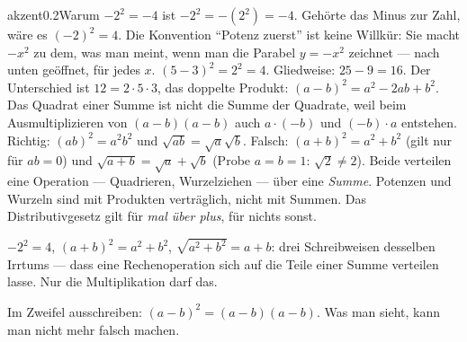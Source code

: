 \begin{loesungkarte}{akzent}{0.2}{Warum $-2^{2} = -4$ ist}
$-2^{2} = -(2^{2}) = -4$. Gehörte das Minus zur Zahl, wäre es $(-2)^{2} = 4$. Die Konvention \enquote{Potenz zuerst} ist keine Willkür: Sie macht $-x^{2}$ zu dem, was man meint, wenn man die Parabel $y = -x^{2}$ zeichnet --- nach unten geöffnet, für jedes $x$.
$(5 - 3)^{2} = 2^{2} = 4$. Gliedweise: $25 - 9 = 16$. Der Unterschied ist $12 = 2\cdot5\cdot3$, das doppelte Produkt: $(a - b)^{2} = a^{2} - 2ab + b^{2}$. Das Quadrat einer Summe ist nicht die Summe der Quadrate, weil beim Ausmultiplizieren von $(a - b)(a - b)$ auch $a\cdot(-b)$ und $(-b)\cdot a$ entstehen.
Richtig: $(ab)^{2} = a^{2}b^{2}$ und $\sqrt{ab} = \sqrt a\sqrt b$. Falsch: $(a + b)^{2} = a^{2} + b^{2}$ (gilt nur für $ab = 0$) und $\sqrt{a + b} = \sqrt a + \sqrt b$ (Probe $a = b = 1$: $\sqrt2\neq2$).
Beide verteilen eine Operation --- Quadrieren, Wurzelziehen --- über eine \emph{Summe}. Potenzen und Wurzeln sind mit Produkten verträglich, nicht mit Summen. Das Distributivgesetz gilt für \emph{mal über plus}, für nichts sonst.
\begin{fehler}\kastentext
$-2^{2} = 4$, $(a + b)^{2} = a^{2} + b^{2}$, $\sqrt{a^{2} + b^{2}} = a + b$: drei Schreibweisen desselben Irrtums --- dass eine Rechenoperation sich auf die Teile einer Summe verteilen lasse. Nur die Multiplikation darf das.
\end{fehler}
\begin{mitnehmen}\kastentext
Im Zweifel ausschreiben: $(a - b)^{2} = (a - b)(a - b)$. Was man sieht, kann man nicht mehr falsch machen.
\end{mitnehmen}
\end{loesungkarte}

